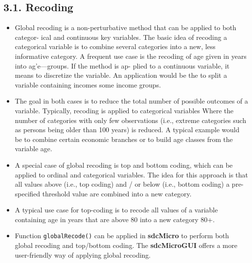 \documentclass[]{article}
\begin{document}
\subsection*{3.1. Recoding}
\begin{itemize}
\item Global recoding is a non-perturbative method that can be applied to both categor-
ical and continuous key variables. The basic idea of recoding a categorical variable
is to combine several categories into a new, less informative category. A frequent
use case is the recoding of age given in years into ag'e—groups. If the method is ap-
plied to a continuous variable, it means to discretize the variable. An application
would be the to split a variable containing incomes some income groups.
\item The goal in both cases is to reduce the total number of possible outcomes of a
variable. Typically, recoding is applied to categorical variables Where the number
of categories with only few observations (i.e., extreme categories such as persons
being older than 100 years) is reduced. A typical example would be to combine
certain economic branches or to build age classes from the variable age.
\item A special case of global recoding is top and bottom coding, which can be applied
to ordinal and categorical variables. The idea for this approach is that all values
above (i.e., top coding) and / or below (i.e., bottom coding) a pre-speciﬁed threshold
value are combined into a new category. 
\item A typical use case for top-coding is to
recode all values of a variable containing age in years that are above 80 into a new
category 80+.

\item Function \texttt{globalRecode()} can be applied in \textbf{sdcMicro} to perform both global
recoding and top/bottom coding. The \textbf{sdcMicroGUI} offers a more user-friendly
way of applying global recoding.
\end{itemize}
\end{document}
